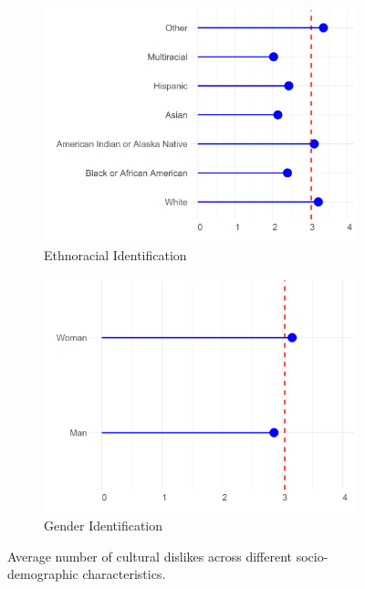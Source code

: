 \documentclass[12pt]{article}
\begin{document}
\begin{figure}[ht!]
\begin{subfigure}[b]{0.3\textwidth}
        \includegraphics[width=1.0\textwidth]{Plots/uni-dist-grd-int-rac.png}
            \caption{Ethnoracial Identification}
            \label{fig:grd-int-rac}
    \end{subfigure}
     \begin{subfigure}[b]{0.3\textwidth}
        \includegraphics[width=1.0\textwidth]{Plots/uni-dist-grd-int-gen.png}
            \caption{Gender Identification}
            \label{fig:grd-int-gen}
    \end{subfigure}
    \caption{Average number of cultural dislikes across different socio-demographic characteristics.}
    \label{fig:grd-int}
\end{figure}
\end{document}
